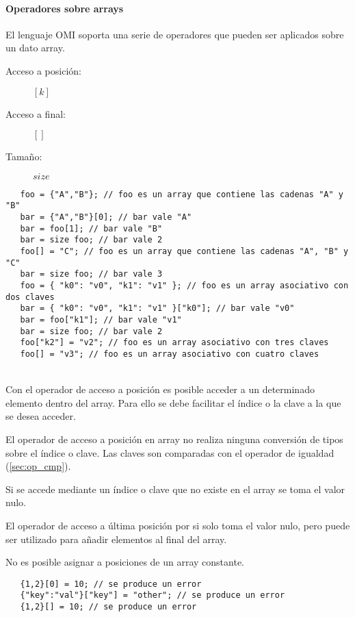 \paragraph{Operadores sobre arrays} \label{sec:op_array}
El lenguaje OMI soporta una serie de operadores que pueden ser aplicados sobre un dato array.

\begin{description}
\item [Acceso a posición:] $[k]$
\item [Acceso a final:] $[]$
\item [Tamaño:] $size$
\end{description} 

\begin{lstlisting}
   foo = {"A","B"}; // foo es un array que contiene las cadenas "A" y "B"
   bar = {"A","B"}[0]; // bar vale "A"
   bar = foo[1]; // bar vale "B"
   bar = size foo; // bar vale 2
   foo[] = "C"; // foo es un array que contiene las cadenas "A", "B" y "C"
   bar = size foo; // bar vale 3
   foo = { "k0": "v0", "k1": "v1" }; // foo es un array asociativo con dos claves
   bar = { "k0": "v0", "k1": "v1" }["k0"]; // bar vale "v0"
   bar = foo["k1"]; // bar vale "v1"
   bar = size foo; // bar vale 2
   foo["k2"] = "v2"; // foo es un array asociativo con tres claves
   foo[] = "v3"; // foo es un array asociativo con cuatro claves
\end{lstlisting} 
\hfill\\

Con el operador de acceso a posición es posible acceder a un determinado elemento
dentro del array. Para ello se debe facilitar el índice o la clave a la que 
se desea acceder. 

El operador de acceso a posición en array no realiza ninguna conversión de tipos sobre 
el índice o clave. Las claves son comparadas con el operador de igualdad (\autoref{sec:op_cmp}).

Si se accede mediante un índice o clave que no existe en el array se toma el valor nulo.

El operador de acceso a última posición por si solo toma el valor nulo, pero puede ser utilizado 
para añadir elementos al final del array. 

No es posible asignar a posiciones de un array constante. \\

\begin{lstlisting}
   {1,2}[0] = 10; // se produce un error
   {"key":"val"}["key"] = "other"; // se produce un error
   {1,2}[] = 10; // se produce un error
\end{lstlisting} 
\hfill\\

